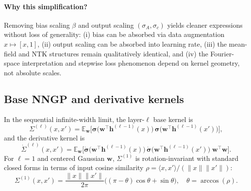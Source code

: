 \documentclass{article}
\DeclareRobustCommand{\ReLU}{\mathrel{\boldsymbol{\sigma}}}
\begin{document}
\paragraph{Why this simplification?}
Removing bias scaling \( \beta \) and output scaling \( (\sigma_A, \sigma_c) \) yields cleaner expressions without loss of generality: (i) bias can be absorbed via data augmentation \( x \mapsto [x, 1] \), (ii) output scaling can be absorbed into learning rate, (iii) the mean-field and NTK structures remain qualitatively identical, and (iv) the Fourier-space interpretation and stepwise loss phenomenon depend on kernel geometry, not absolute scales.

\vspace{1em}
\subsection{Base NNGP and derivative kernels}
In the sequential infinite-width limit, the layer-\( \ell \) base kernel is
\begin{equation}
\Sigma^{(\ell)}(x,x')
= \mathbb{E}_{\bm{w}}\Big[\ReLU\!\big(\bm{w}^\top \bm{h}^{(\ell-1)}(x)\big)\,\ReLU\!\big(\bm{w}^\top \bm{h}^{(\ell-1)}(x')\big)\Big],
\end{equation}
and the derivative kernel is
\begin{equation}
\dot{\Sigma}^{(\ell)}(x,x')
= \mathbb{E}_{\bm{w}}\Big[\dot{\ReLU}\!\big(\bm{w}^\top \bm{h}^{(\ell-1)}(x)\big)\,\dot{\ReLU}\!\big(\bm{w}^\top \bm{h}^{(\ell-1)}(x')\big)\;\bm{w}^\top\bm{w}\Big].
\end{equation}
For \( \ell=1 \) and centered Gaussian \( \bm{w} \), \( \Sigma^{(1)} \) is rotation-invariant with standard closed forms in terms of input cosine similarity \( \rho = \langle x,x'\rangle/(\|x\|\|x'\|) \):
\[
\Sigma^{(1)}(x,x') = \frac{\|x\|\|x'\|}{2\pi}\big((\pi-\theta)\cos\theta + \sin\theta\big), \quad \theta = \arccos(\rho).
\]

\vspace{1em}
\end{document}
